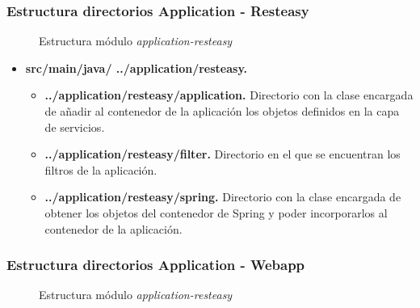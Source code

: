 \subsubsection*{Estructura directorios Application - Resteasy}
\begin{figure}[H]
\centering
{}
\caption{Estructura módulo \textit{application-resteasy}}
\end{figure}

\begin{itemize}
	\item \textbf{src/main/java/ ../application/resteasy. }
	\begin{itemize}
		\item \textbf{../application/resteasy/application. } Directorio con la clase encargada de añadir al contenedor de la aplicación los objetos definidos en la capa de servicios.		
		\item \textbf{../application/resteasy/filter. } Directorio en el que se encuentran los filtros de la aplicación.
		\item \textbf{../application/resteasy/spring. } Directorio con la clase encargada de obtener los objetos del contenedor de Spring y poder incorporarlos al contenedor de la aplicación.
	\end{itemize}
\end{itemize}



\subsubsection*{Estructura directorios Application - Webapp}
\begin{figure}[H]
\centering
{}
\caption{Estructura módulo \textit{application-resteasy}}
\end{figure}

